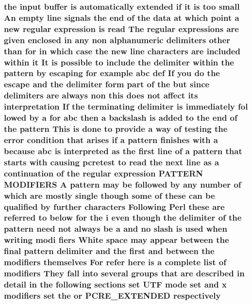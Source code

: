 \subsubsection[{\texorpdfstring{respectively}{respectively}}]{\setlength{\rightskip}{0pt plus 5cm}the {\bf input} {\bf buffer} {\bf is} automatically extended {\bf if} {\bf it} {\bf is} too small An {\bf empty} {\bf line} signals the {\bf end} {\bf of} the {\bf data} at {\bf which} {\bf point} {\bf a} new regular {\bf expression} {\bf is} {\bf read} The regular {\bf expressions} {\bf are} {\bf given} enclosed {\bf in} {\bf any} non {\bf alphanumeric} delimiters other {\bf than} for {\bf in} {\bf which} {\bf case} the new {\bf line} {\bf characters} {\bf are} {\bf included} within {\bf it} It {\bf is} {\bf possible} {\bf to} {\bf include} the delimiter within the {\bf pattern} by escaping for {\bf example} {\bf abc} def If you {\bf do} the escape and the delimiter form part {\bf of} the but since delimiters {\bf are} always non {\bf this} does {\bf not} affect its interpretation If the terminating delimiter {\bf is} immediately fol lowed by {\bf a} for {\bf abc} then {\bf a} {\bf backslash} {\bf is} added {\bf to} the {\bf end} {\bf of} the {\bf pattern} This {\bf is} {\bf done} {\bf to} provide {\bf a} {\bf way} {\bf of} testing the {\bf error} condition that {\bf arises} {\bf if} {\bf a} {\bf pattern} finishes {\bf with} {\bf a} because {\bf abc} {\bf is} interpreted {\bf as} the {\bf first} {\bf line} {\bf of} {\bf a} {\bf pattern} that starts {\bf with} causing {\bf pcretest} {\bf to} {\bf read} the next {\bf line} {\bf as} {\bf a} continuation {\bf of} the regular {\bf expression} P\+A\+T\+T\+E\+RN M\+O\+D\+I\+F\+I\+E\+RS {\bf A} {\bf pattern} may {\bf be} followed by {\bf any} {\bf number} {\bf of} {\bf which} {\bf are} mostly single {\bf though} some {\bf of} these {\bf can} {\bf be} qualified by further {\bf characters} Following {\bf Perl} these {\bf are} referred {\bf to} {\bf below} for the {\bf i} even {\bf though} the delimiter {\bf of} the {\bf pattern} need {\bf not} always {\bf be} {\bf a} and no {\bf slash} {\bf is} {\bf used} when writing modi fiers White {\bf space} may appear between the final {\bf pattern} delimiter and the {\bf first} and between the {\bf modifiers} {\bf themselves} For refer {\bf here} {\bf is} {\bf a} complete {\bf list} {\bf of} {\bf modifiers} They fall into several groups that {\bf are} described {\bf in} detail {\bf in} the following sections {\bf set} U\+TF {\bf mode} {\bf set} and {\bf x} {\bf modifiers} {\bf set} the {\bf or} {\bf P\+C\+R\+E\+\_\+\+E\+X\+T\+E\+N\+D\+ED} respectively}\hypertarget{pcretest_8txt_abb6882e5938a95477150a9f78823bfdb}{}\label{pcretest_8txt_abb6882e5938a95477150a9f78823bfdb}
